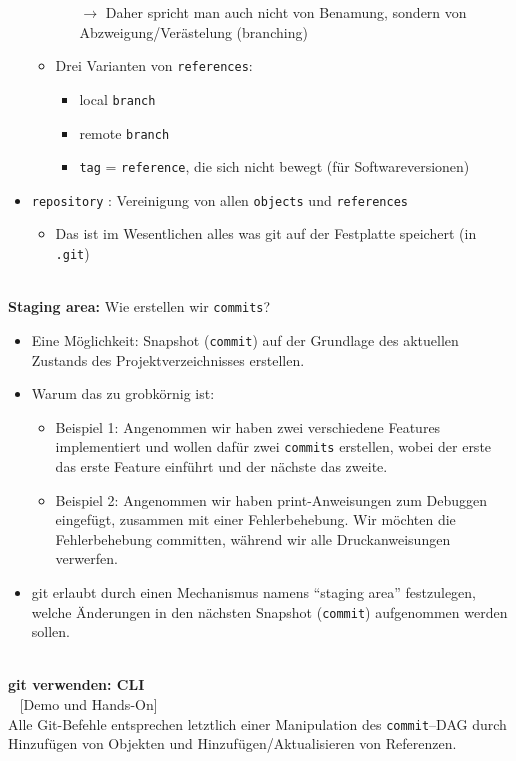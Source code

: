 \begin{itemize}
\begin{itemize}
\begin{itemize}
			$\rightarrow$ Daher spricht man auch nicht von Benamung, sondern von Abzweigung/Verästelung (branching)
		\end{itemize}
		\item Drei Varianten von \texttt{references}:
		\begin{itemize}
			\item local \texttt{branch}
			\item remote \texttt{branch}
			\item \texttt{tag} = \texttt{reference}, die sich nicht bewegt (für Softwareversionen)
		\end{itemize}
	\end{itemize}
	\item \texttt{repository} : Vereinigung von allen \texttt{objects} und \texttt{references}
	\begin{itemize}
		\item Das ist im Wesentlichen alles was git auf der Festplatte speichert (in \texttt{.git})
	\end{itemize}
\end{itemize}
~\\
\textbf{Staging area:} Wie erstellen wir \texttt{commits}? 
\begin{itemize}
	\item Eine Möglichkeit: Snapshot (\texttt{commit}) auf der Grundlage des aktuellen Zustands des Projektverzeichnisses erstellen.
	\item Warum das zu grobkörnig ist:
	\begin{itemize}
		\item Beispiel 1: Angenommen wir haben zwei verschiedene Features implementiert und wollen dafür zwei \texttt{commits} erstellen, wobei der erste das erste Feature einführt und der nächste das zweite. 
		\item Beispiel 2: Angenommen wir haben print-Anweisungen zum Debuggen eingefügt, zusammen mit einer Fehlerbehebung. Wir möchten die Fehlerbehebung committen, während wir alle Druckanweisungen verwerfen.
	\end{itemize}
\item git erlaubt durch einen Mechanismus namens ``staging area'' festzulegen, welche Änderungen in den nächsten Snapshot (\texttt{commit}) aufgenommen werden sollen.
\end{itemize} 

~\\
\textbf{git verwenden: CLI}\\~
[Demo und Hands-On]\\
Alle Git-Befehle entsprechen letztlich einer Manipulation des \texttt{commit}--DAG durch Hinzufügen von Objekten und Hinzufügen/Aktualisieren von Referenzen.


